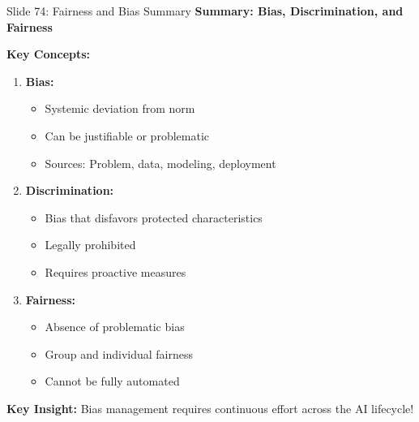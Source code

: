 \documentclass[8pt]{beamer}
\begin{document}
	\begin{frame}{Slide 74: Fairness and Bias Summary}
		\fontsize{6.5}{7.5}\selectfont
		\textbf{Summary: Bias, Discrimination, and Fairness}
		
		\vspace{0.1cm}
		\textbf{Key Concepts:}
		\begin{enumerate}
			\item \textbf{Bias:}
			\begin{itemize}
				\item Systemic deviation from norm
				\item Can be justifiable or problematic
				\item Sources: Problem, data, modeling, deployment
			\end{itemize}
			\item \textbf{Discrimination:}
			\begin{itemize}
				\item Bias that disfavors protected characteristics
				\item Legally prohibited
				\item Requires proactive measures
			\end{itemize}
			\item \textbf{Fairness:}
			\begin{itemize}
				\item Absence of problematic bias
				\item Group and individual fairness
				\item Cannot be fully automated
			\end{itemize}
		\end{enumerate}
		
		\textcolor{myblue}{\textbf{Key Insight:}} Bias management requires \textcolor{myblue}{continuous effort across the AI lifecycle}!
	\end{frame}
	
\end{document}
